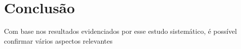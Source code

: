 \section{Conclus\~{a}o}\label{sec:conclusao}

Com base nos resultados evidenciados por esse estudo sistem\'{a}tico, \'{e} poss\'{i}vel confirmar v\'{a}rios aspectos relevantes 
